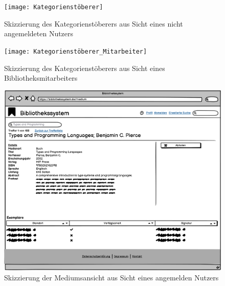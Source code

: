 \documentclass{article}
\begin{document}
\begin{figure}[h]
    \centering
    \texttt{[image: Kategorienstöberer]}
    \caption{Skizzierung des Kategorienstöberers aus Sicht eines nicht angemeldeten Nutzers}
    \label{katstoeb}
\end{figure}

\begin{figure}[h]
    \centering
    \texttt{[image: Kategorienstöberer\_Mitarbeiter]}
    \caption{Skizzierung des Kategorienstöberers aus Sicht eines Bibliotheksmitarbeiters}
    \label{katstoebmit}
\end{figure}

\begin{figure}[h]
    \centering
    \includegraphics[width = 40em]{Mediumsansicht}
    \caption{Skizzierung der Mediumsansicht aus Sicht eines angemelden Nutzers}
    \label{mediumsansicht}
\end{figure}

\newpage
{}
\end{document}
